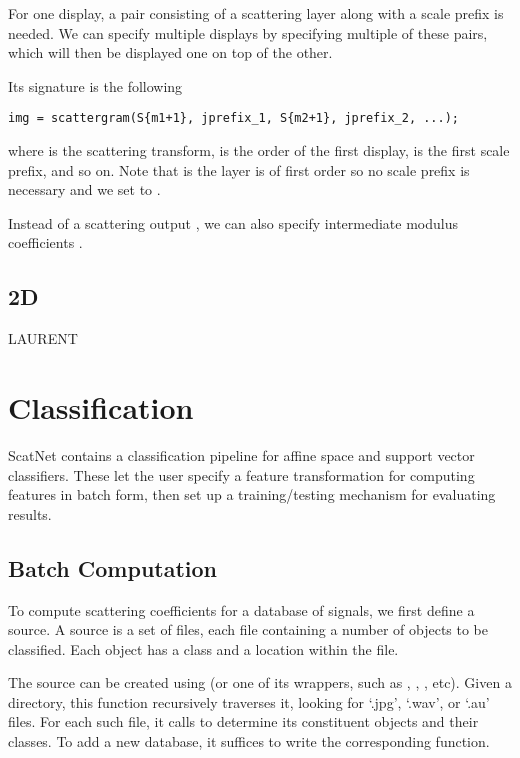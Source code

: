 \documentclass[twocolumn]{article}
\begin{document}
For one display, a pair consisting of a scattering layer along with a scale prefix is needed. We can specify multiple displays by specifying multiple of these pairs, which will then be displayed one on top of the other.

Its signature is the following
\begin{lstlisting}
img = scattergram(S{m1+1}, jprefix_1, S{m2+1}, jprefix_2, ...);
\end{lstlisting}
where  is the scattering transform,  is the order of the first display,  is the first scale prefix, and so on. Note that is  the layer is of first order so no scale prefix is necessary and we set  to \mcode{[]}.

Instead of a scattering output , we can also specify intermediate modulus coefficients .

\subsection{2D}

LAURENT

\section{Classification}

ScatNet contains a classification pipeline for affine space and support vector classifiers. These let the user specify a feature transformation for computing features in batch form, then set up a training/testing mechanism for evaluating results.

\subsection{Batch Computation}

To compute scattering coefficients for a database of signals, we first define a source. A source is a set of files, each file containing a number of objects to be classified. Each object has a class and a location within the file.

The source can be created using  (or one of its wrappers, such as , , , etc). Given a directory, this function recursively traverses it, looking for `.jpg', `.wav', or `.au' files. For each such file, it calls  to determine its constituent objects and their classes. To add a new database, it suffices to write the corresponding  function.
\end{document}
